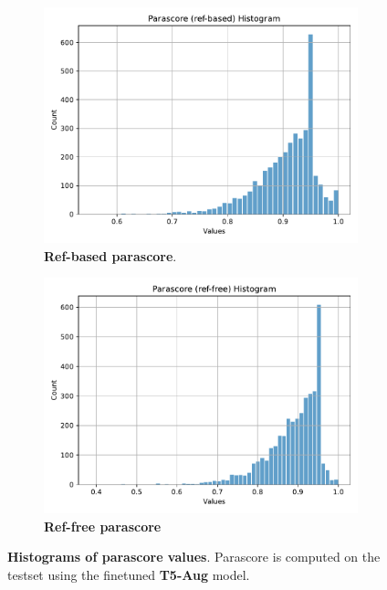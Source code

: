 \documentclass[fleqn,moreauthors,10pt]{ds_report}
\begin{document}
\begin{figure}[ht]
    \centering
    \begin{subfigure}{0.45\linewidth} %
        \centering
        \includegraphics[width=\textwidth]{report/fig/t5-aug-parascore-ref-based-hist.pdf}
        \caption{\textbf{Ref-based parascore}.}
        \label{fig:t5-aug-parascore-ref-based-hist}
    \end{subfigure}
    \hfill %
    \begin{subfigure}{0.45\linewidth} %
        \centering
        \includegraphics[width=\textwidth]{report/fig/t5-aug-parascore-ref-free-hist.pdf}
        \caption{\textbf{Ref-free parascore}}
        \label{fig:t5-aug-parascore-ref-free-hist}
    \end{subfigure}
    \caption{\textbf{Histograms of parascore values}. Parascore is computed on the testset using the finetuned \textbf{T5-Aug} model.}
    \label{fig:t5-parascore-hist}
\end{figure}
\end{document}
